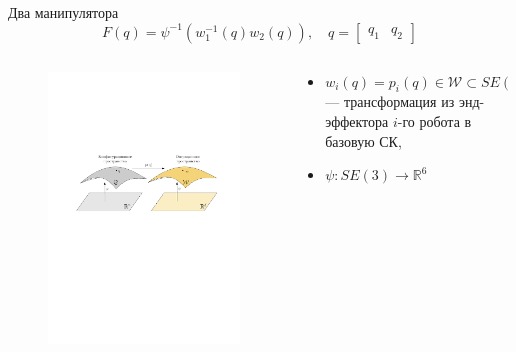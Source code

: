 \documentclass[11pt, aspectratio=169]{beamer}
\newcommand{\R}{\mathbb{R}}
\newcommand{\SE}[1]{SE(#1)}
\newcommand{\R}{\mathbb{R}}
\begin{document}
\begin{frame}{Два манипулятора}
    \begin{equation}
        F(q) = \psi^{-1}(w^{-1}_1(q)w_2(q)), \quad q = \begin{bmatrix} q_1 & q_2\end{bmatrix}
    \end{equation}
    \begin{columns}
        \begin{column}{0.55\textwidth}
            \begin{figure}
                \centering
                \includegraphics[width=1.0\textwidth]{figures/graph/manifolds.pdf}
                \label{fig:manifolds}
            \end{figure}
        \end{column}
        \begin{column}{0.42\textwidth}
            \begin{itemize}
                \item $w_i(q) = p_i(q) \in \mathcal{W} \subset \SE{3}$  --- трансформация из энд-эффектора $i$-го робота в базовую СК,
                \item $\psi: \SE{3} \rightarrow \R^6$
            \end{itemize}
        \end{column}
    \end{columns}
\end{frame}
\end{document}
